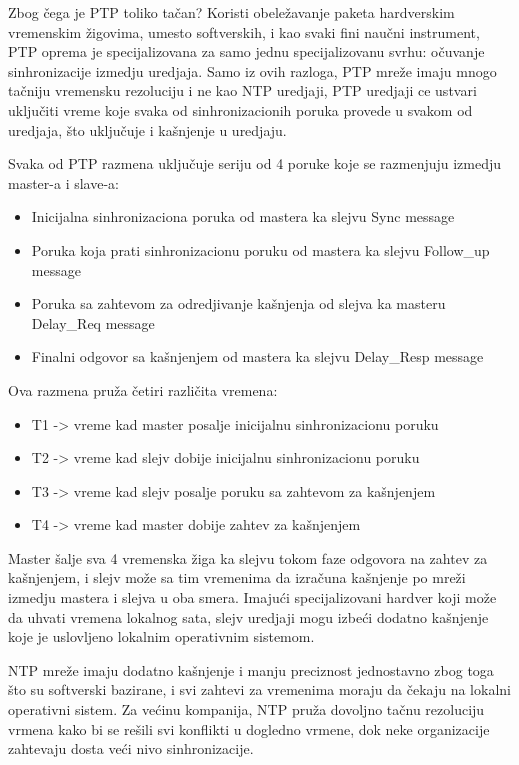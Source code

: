 \documentclass[a4paper,12pt, master]{etf}
\begin{document}
	Zbog \v{c}ega je PTP toliko ta\v{c}an? Koristi obele\v{z}avanje paketa 
	hardverskim vremenskim \v{z}igovima, umesto softverskih, i kao svaki fini 
	nau\v{c}ni instrument, PTP oprema je specijalizovana za samo jednu 
	specijalizovanu svrhu: o\v{c}uvanje sinhronizacije izmedju uredjaja. Samo 
	iz ovih razloga, PTP mre\v{z}e imaju mnogo ta\v{c}niju vremensku rezoluciju 
	i ne kao NTP uredjaji, PTP uredjaji ce ustvari uklju\v{c}iti vreme koje 
	svaka od sinhronizacionih poruka provede u svakom od uredjaja, \v{s}to 
	uklju\v{c}uje i ka\v{s}njenje u uredjaju.

	Svaka od PTP razmena uklju\v{c}uje seriju od 4 poruke koje se razmenjuju 
	izmedju master-a i slave-a:
	\begin{itemize}
		\item Inicijalna sinhronizaciona poruka od mastera ka slejvu {Sync 
		message}
		\item Poruka koja prati sinhronizacionu poruku od mastera ka slejvu 
		{Follow\_up message}
		\item Poruka sa zahtevom za odredjivanje ka\v{s}njenja od slejva ka 
		masteru {Delay\_Req	message}
		\item Finalni odgovor sa ka\v{s}njenjem od mastera ka slejvu 
		{Delay\_Resp message}
	\end{itemize}

	Ova razmena pru\v{z}a \v{c}etiri razli\v{c}ita vremena:
	\begin{itemize}
		\item T1 -> vreme kad master posalje inicijalnu sinhronizacionu poruku
		\item T2 -> vreme kad slejv dobije inicijalnu sinhronizacionu poruku
		\item T3 -> vreme kad slejv posalje poruku sa zahtevom za ka\v{s}njenjem
		\item T4 -> vreme kad master dobije zahtev za ka\v{s}njenjem
	\end{itemize}

	Master \v{s}alje sva 4 vremenska \v{z}iga ka slejvu tokom faze odgovora na 
	zahtev za ka\v{s}njenjem, i slejv mo\v{z}e sa tim vremenima da izra\v{c}una 
	ka\v{s}njenje po mre\v{z}i izmedju mastera i slejva u oba smera. 
	Imaju\'{c}i specijalizovani hardver koji mo\v{z}e da uhvati vremena 
	lokalnog sata, slejv uredjaji mogu izbe\'{c}i dodatno ka\v{s}njenje koje je 
	uslovljeno lokalnim operativnim	sistemom.

	NTP mre\v{z}e imaju dodatno ka\v{s}njenje i manju preciznost jednostavno 
	zbog toga \v{s}to su softverski bazirane, i svi zahtevi za vremenima moraju 
	da \v{c}ekaju na lokalni operativni	sistem. Za ve\'{c}inu kompanija, NTP 
	pru\v{z}a dovoljno ta\v{c}nu rezoluciju vrmena kako bi se re\v{s}ili
	svi konflikti u dogledno vrmene, dok neke organizacije zahtevaju dosta 
	ve\'{c}i nivo sinhronizacije.
\end{document}
